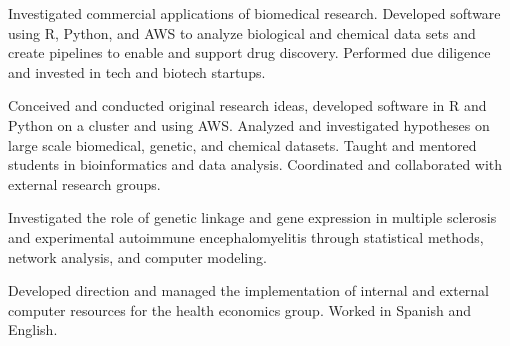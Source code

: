 \begin{resume}
\vspace{-0.5em}


\title{\small{}}
\begin{position}
Investigated commercial applications of biomedical research. Developed software using R, Python, and AWS to analyze biological and chemical data sets and create pipelines to enable and support drug discovery.  Performed due diligence and invested in tech and biotech startups.
\end{position}

\vspace{-0.5em}

\title{\small{}}
\begin{position}
Conceived and conducted original research ideas, developed software in R and Python on a cluster and using AWS.
Analyzed and investigated hypotheses on large scale biomedical, genetic, and chemical datasets.
Taught and mentored students in bioinformatics and data analysis.
Coordinated and collaborated with external research groups.
\end{position}



\title{\small{}}
\begin{position}
Investigated the role of genetic linkage and gene expression in multiple sclerosis and experimental autoimmune encephalomyelitis through statistical methods, network analysis, and computer modeling.
\end{position}


\vspace{-0.5em}
\title{\small{}}
\begin{position}
Developed direction and managed the implementation of internal and external computer resources for the health economics group.  Worked in Spanish and English.
\end{position}



\end{resume}

